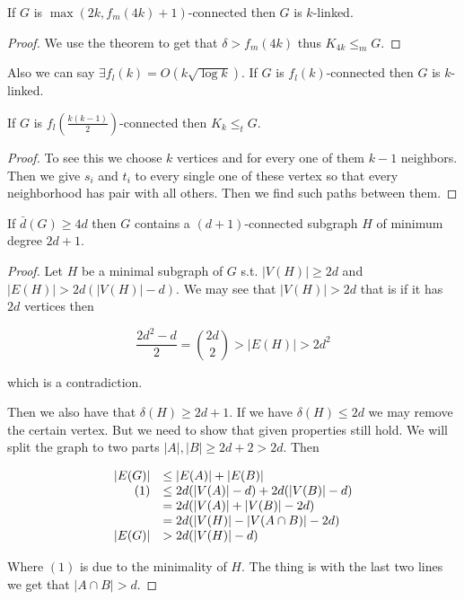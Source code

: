 \begin{cor}
	If $G$ is $\max(2k, f_{m}(4k)+1)$-connected then $G$ is $k$-linked.
\end{cor}

\begin{proof}
	We use the theorem to get that $\delta > f_{m}(4k)$ thus $K_{4k} \leq_{m} G$.
\end{proof}

Also we can say $\exists f_{l}(k) = O(k \sqrt{\log k})$. If $G$ is $f_{l}(k)$-connected then $G$ is $k$-linked.

\begin{cor}
	If $G$ is $f_{l}\left( \frac{k (k-1)}{2}\right)$-connected then $K_{k} \leq_{t} G$.
\end{cor}

\begin{proof}
	To see this we choose $k$ vertices and for every one of them $k-1$ neighbors. Then we give $s_{i}$ and $t_{i}$ to every single one of these vertex so that every neighborhood has pair with all others. Then we find such paths between them.
\end{proof}

\begin{lemma}
	If $\bar{d}(G) \geq 4d$ then $G$ contains a $(d+1)$-connected subgraph $H$ of minimum degree $2d+1$.
\end{lemma}

\begin{proof}
	Let $H$ be a minimal subgraph of $G$ s.t. $|V(H)| \geq 2d$ and $|E(H)| > 2d (|V(H)| - d)$. We may see that $|V(H)| > 2d$ that is if it has $2d$ vertices then
	
	$$
	\frac{2d^{2} - d}{2} = \binom{2d}{2} > |E(H)| > 2d^{2}
	$$
	
	which is a contradiction.
	
	Then we also have that $\delta (H) \geq 2d+1$. If we have $\delta(H) \leq 2d$ we may remove the certain vertex. But we need to show that given properties still hold. We will split the graph to two parts $|A|, |B| \geq 2d+2 > 2d$. Then
	
	$$
	\begin{array}{r l}
		|E(G)| & \leq |E(A)| + |E(B)| \\
		(1) & \leq 2d(|V(A)| - d) + 2d(|V(B)| - d) \\
		& = 2d(|V(A)| + |V(B)| - 2d) \\
		& = 2d(|V(H)| - |V(A \cap B)| - 2d) \\
		|E(G)| & > 2d(|V(H)| - d)
	\end{array}
	$$
	
	Where $(1)$ is due to the minimality of $H$. The thing is with the last two lines we get that $|A \cap B| > d$.
\end{proof}

